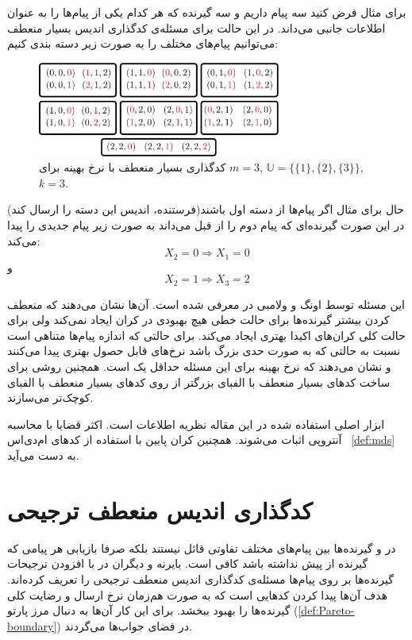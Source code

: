 برای مثال فرض کنید سه پیام داریم و سه گیرنده که هر کدام یکی از پیام‌ها را به عنوان اطلاعات جانبی می‌داند. در این حالت برای مسئله‌ی کدگذاری اندیس بسیار منعطف می‌توانیم پیام‌های مختلف را به صورت زیر دسته بندی کنیم:
\begin{figure}[H]
	\centering
	\includegraphics[width=8cm]{figs/chapter4/Alpha3}
	\caption{
		کدگذاری بسیار منعطف با نرخ بهینه برای
		$m=3$, 
		$\mathbb{U} = \big\{ \{1\}, \{2\}, \{3\} \big\}$,
		$k=3$.
	}
	\label{fig:eg:0}
\end{figure}
حال برای مثال اگر پیام‌ها از دسته اول باشند(فرستنده، اندیس این دسته را ارسال کند) در این صورت گیرنده‌ای که پیام دوم را از قبل می‌داند به صورت زیر پیام جدیدی را پیدا می‌کند:
$$X_2 = 0 \Rightarrow X_1 = 0$$
و
$$X_2 = 1 \Rightarrow X_3 = 2$$


این مسئله توسط اونگ و ولامبی در
\cite{verypliable}
معرفی شده است. آن‌ها نشان می‌دهند که منعطف کردن بیشتر گیرنده‌ها برای حالت خطی هیچ بهبودی در کران ایجاد نمی‌کند ولی برای حالت کلی کران‌های اکیدا بهتری ایجاد می‌کند. برای حالتی که اندازه پیام‌ها متناهی است نسبت به حالتی که به صورت حدی بزرگ باشد نرخ‌های قابل حصول بهتری پیدا می‌کنند و  نشان می‌دهند که نرخ بهینه برای این مسئله حداقل یک است. همچنین روشی برای ساخت کدهای بسیار منعطف با الفبای بزرگتر از روی کدهای بسیار منعطف با الفبای کوچک‌تر می‌سازند.

ابزار اصلی استفاده شده در این مقاله نظریه اطلاعات است. اکثر قضایا با محاسبه آنتروپی اثبات می‌شوند. همچنین کران پایین با استفاده از
 کدهای ام‌دی‌اس
 ~\autoref{def:mds}
به دست می‌آید.


\section{کدگذاری اندیس منعطف ترجیحی}
در 
\icod
 و 
 \picod
 گیرنده‌ها بین پیام‌های مختلف تفاوتی قائل نیستند بلکه صرفا بازیابی هر پیامی که گیرنده از پیش نداشته باشد کافی است. بایرنه و دیگران در
\cite{byrne2023preferential}
با افزودن ترجیحات گیرنده‌ها بر روی پیام‌ها مسئله‌ی کدگذاری اندیس منعطف ترجیحی را تعریف کرده‌اند. هدف آن‌ها پیدا کردن کدهایی است که به صورت هم‌زمان نرخ ارسال و رضایت کلی گیرنده‌ها را بهبود ببخشد. برای این کار آن‌ها به دنبال مرز پارتو (\autoref{def:Pareto-boundary})
 در فضای جواب‌ها می‌گردند.
 
